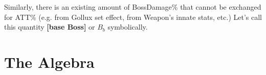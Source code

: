 \documentclass{article}
\begin{document}
Similarly, there is an existing amount of BossDamage\% that cannot be exchanged for ATT\% (e.g. from Gollux set effect, from Weapon's innate stats, etc.) Let's call this quantity \textbf{[base Boss]} or $B_b$ symbolically.

\clearpage

\section{The Algebra}






\end{document}
